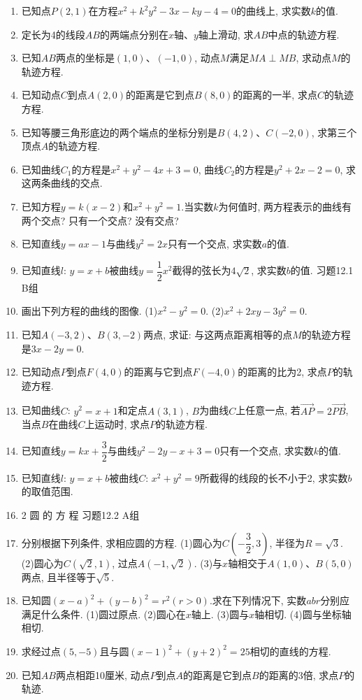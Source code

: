\documentclass[10pt,a4paper]{article}
\begin{document}
\begin{enumerate}[1.]
\item 已知点$P(2,1)$在方程$x^2+k^2y^2-3x-ky-4=0$的曲线上, 求实数$k$的值.
\item 定长为4的线段$AB$的两端点分别在$x$轴、$y$轴上滑动, 求$AB$中点的轨迹方程.
\item 已知$AB$两点的坐标是$(1,0)$、$(-1,0)$, 动点$M$满足$MA\perp MB$, 求动点$M$的轨迹方程.
\item 已知动点$C$到点$A(2,0)$的距离是它到点$B(8,0)$的距离的一半, 求点$C$的轨迹方程.
\item 已知等腰三角形底边的两个端点的坐标分别是$B(4,2)$、$C(-2,0)$, 求第三个顶点$A$的轨迹方程.
\item 已知曲线$C_1$的方程是$x^2+y^2-4x+3=0$, 曲线$C_2$的方程是$y^2+2x-2=0$, 求这两条曲线的交点.
\item 已知方程$y=k(x-2)$和$x^2+y^2=1$.当实数$k$为何值时, 两方程表示的曲线有两个交点? 只有一个交点? 没有交点?
\item 已知直线$y=ax-1$与曲线$y^2=2x$只有一个交点, 求实数$a$的值.
\item 已知直线$l$: $y=x+b$被曲线$y=\dfrac 12x^2$截得的弦长为$4\sqrt 2$, 求实数$b$的值.
习题12.1  B组
\item 画出下列方程的曲线的图像.
(1)$x^2-y^2=0$.							(2)$x^2+2xy-3y^2=0$.
\item 已知$A(-3,2)$、$B(3,-2)$两点, 求证: 与这两点距离相等的点$M$的轨迹方程是$3x-2y=0$.
\item 已知动点$P$到点$F(4,0)$的距离与它到点$F(-4,0)$的距离的比为2, 求点$P$的轨迹方程.
\item 已知曲线$C$: $y^2=x+1$和定点$A(3,1)$, $B$为曲线$C$上任意一点, 若$\overrightarrow {AP}=2\overrightarrow {PB}$, 当点$B$在曲线$C$上运动时, 求点$P$的轨迹方程.
\item 已知直线$y=kx+\dfrac 32$与曲线$y^2-2y-x+3=0$只有一个交点, 求实数$k$的值.
\item 已知直线$l$: $y=x+b$被曲线$C$: $x^2+y^2=9$所截得的线段的长不小于2, 求实数$b$的取值范围.
\item 2  圆 的 方 程
习题12.2  A组
\item 分别根据下列条件, 求相应圆的方程.
(1)圆心为$C(-\dfrac 32,3)$, 半径为$R=\sqrt 3$.
(2)圆心为$C(\sqrt 2,1)$, 过点$A(-1,\sqrt 2)$.
(3)与$x$轴相交于$A(1,0)$、$B(5,0)$两点, 且半径等于$\sqrt 5$.
\item 已知圆$(x-a)^2+(y-b)^2=r^2(r>0)$.求在下列情况下, 实数$abr$分别应满足什么条件.
(1)圆过原点.
(2)圆心在$x$轴上.
(3)圆与$x$轴相切.
(4)圆与坐标轴相切.
\item 求经过点$(5,-5)$且与圆$(x-1)^2+(y+2)^2=25$相切的直线的方程.
\item 已知$AB$两点相距10厘米, 动点$P$到点$A$的距离是它到点$B$的距离的3倍, 求点$P$的轨迹.

\end{enumerate}
\end{document}
